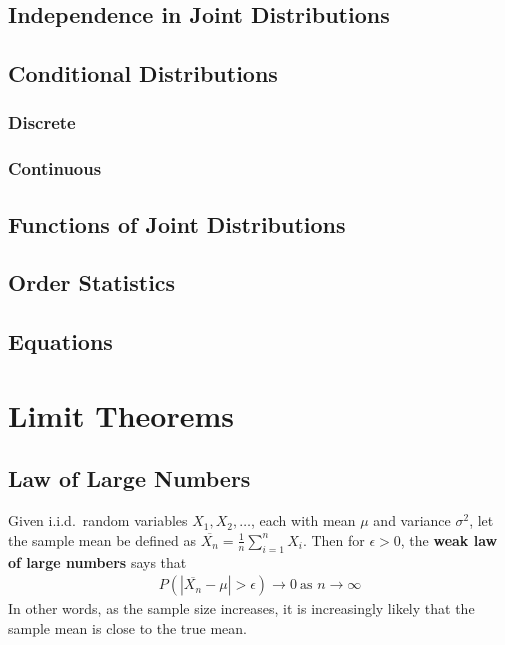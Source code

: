 \documentclass[a4paper,10pt]{article}
\begin{document}
\subsection{Independence in Joint Distributions}

\subsection{Conditional Distributions}
\subsubsection{Discrete}
\subsubsection{Continuous}

\subsection{Functions of Joint Distributions}

\subsection{Order Statistics}

\subsection{Equations}

\section{Limit Theorems}

\subsection{Law of Large Numbers}

Given i.i.d.\ random variables $X_1, X_2, \ldots$, each with mean $\mu$ and variance $\sigma^2$, let the sample mean be defined as $\overline{X_n} = \frac{1}{n}\sum_{i=1}^{n}X_i$. Then for $\epsilon > 0$, the \textbf{weak law of large numbers} says that 
\begin{align*}
    P(|\overline{X_n} - \mu| > \epsilon) \to 0~\text{as $n \to \infty$}
\end{align*}
In other words, as the sample size increases, it is increasingly likely that the sample mean is close to the true mean. 
\end{document}
